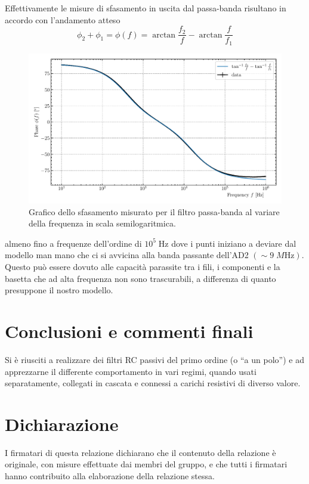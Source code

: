 \documentclass[10pt,a4paper]{article}
\begin{document}
Effettivamente le misure di sfasamento in uscita dal passa-banda risultano
in accordo con l'andamento atteso
\begin{equation}
\phi_2 + \phi_1 = \phi(f) = \arctan{\frac{f_2}{f}} - \arctan{\frac{f}{f_1}}
\end{equation}
\begin{figure}[htb]
\centering
\includegraphics[scale=0.7]{bpfphase}
\caption{Grafico dello sfasamento misurato per il filtro passa-banda al
variare della frequenza in scala semilogaritmica.}
\end{figure}
almeno fino a frequenze dell'ordine di $10^5 \; \si{\Hz}$ dove i punti
iniziano a deviare dal modello man mano che ci si avvicina alla banda
passante dell'AD2 $(\sim 9 \; \si{M\Hz})$. Questo può essere dovuto alle
capacità parassite tra i fili, i componenti e la basetta che ad alta
frequenza non sono trascurabili, a differenza di quanto presuppone il nostro
modello.

\section*{Conclusioni e commenti finali}
Si è riusciti a realizzare dei filtri RC passivi del primo ordine
(o ``a un polo'') e ad apprezzarne il differente comportamento in vari
regimi, quando usati separatamente, collegati in cascata e connessi a
carichi resistivi di diverso valore.

\section*{Dichiarazione}
I firmatari di questa relazione dichiarano che il contenuto della relazione \`e 
originale, con misure effettuate dai membri del gruppo, e che tutti i firmatari 
hanno contribuito alla elaborazione della relazione stessa.
\end{document}
